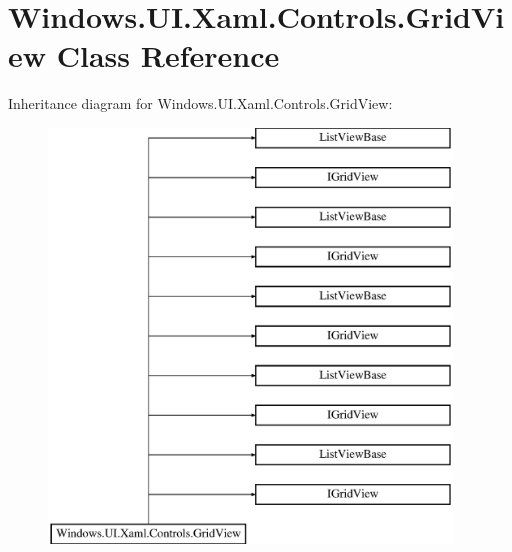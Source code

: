 \hypertarget{class_windows_1_1_u_i_1_1_xaml_1_1_controls_1_1_grid_view}{}\section{Windows.\+U\+I.\+Xaml.\+Controls.\+Grid\+View Class Reference}
\label{class_windows_1_1_u_i_1_1_xaml_1_1_controls_1_1_grid_view}
Inheritance diagram for Windows.\+U\+I.\+Xaml.\+Controls.\+Grid\+View\+:\begin{figure}[H]
\begin{center}
\leavevmode
\includegraphics[height=11.000000cm]{class_windows_1_1_u_i_1_1_xaml_1_1_controls_1_1_grid_view}
\end{center}
\end{figure}
